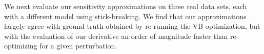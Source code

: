 We next evaluate our sensitivity approximations on three real data sets,
each with a different model using stick-breaking.
We find that our approximations largely agree with ground truth obtained by re-running the VB optimization, but
with the evaluation of our derivative an order of magnitude faster than
re-optimizing for a given perturbation.

